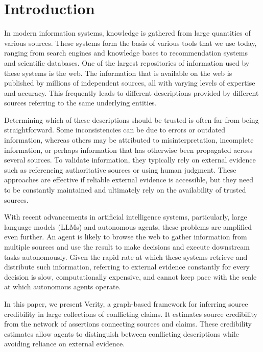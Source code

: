 \section{Introduction}

In modern information systems, knowledge is gathered from large quantities of various sources. These systems form the basis of various tools that we use today, ranging from search engines and knowledge bases to recommendation systems and scientific databases. One of the largest repositories of information used by these systems is the web. The information that is available on the web is published by millions of independent sources, all with varying levels of expertise and accuracy. This frequently leads to different descriptions provided by different sources referring to the same underlying entities.

Determining which of these descriptions should be trusted is often far from being straightforward. Some inconsistencies can be due to errors or outdated information, whereas others may be attributed to misinterpretation, incomplete information, or perhaps information that has otherwise been propagated across several sources. To validate information, they typically rely on external evidence such as referencing authoritative sources or using human judgment. These approaches are effective if reliable external evidence is accessible, but they need to be constantly maintained and ultimately rely on the availability of trusted sources.

With recent advancements in artificial intelligence systems, particularly, large language models (LLMs) and autonomous agents, these problems are amplified even further. An agent is likely to browse the web to gather information from multiple sources and use the result to make decisions and execute downstream tasks autonomously. Given the rapid rate at which these systems retrieve and distribute such information, referring to external evidence constantly for every decision is slow, computationally expensive, and cannot keep pace with the scale at which autonomous agents operate.

In this paper, we present Verity, a graph-based framework for inferring source credibility in large collections of conflicting claims. It estimates source credibility from the network of assertions connecting sources and claims. These credibility estimates allow agents to distinguish between conflicting descriptions while avoiding reliance on external evidence.
